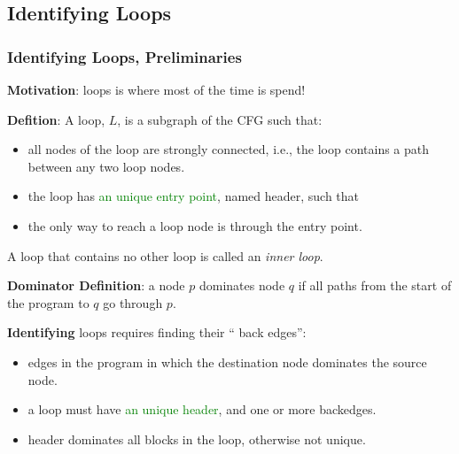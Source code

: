 \documentclass{beamer}
\newcommand{\green}[1]{\textcolor{Green}{{#1}}}
\renewcommand{\emph}[1]{\textcolor{structure}{#1}}
\newcommand{\emp}[1]{\textcolor{DikuRed}{ #1}}
\begin{document}
\subsection{Identifying Loops}


\begin{frame}[fragile,t]
    \frametitle{Identifying Loops, Preliminaries}

{\bf Motivation}: loops is where most of the time is spend!

\pause
\bigskip

{\bf Defition}: A loop, $L$, is a subgraph of the \textsc{CFG} such that:

\begin{itemize}

\item all nodes of the loop are \emp{strongly connected}, i.e., the loop
        contains a path between any two loop nodes.

\item the loop has \green{an unique entry point}, named \emph{header}, such that

\item the only way to reach a loop node is through the entry point.

\end{itemize}

A loop that contains no other loop is called an {\em inner loop}.

\pause
\bigskip

{\bf Dominator Definition}: a node $p$ \emp{dominates} node $q$ if all paths from
the start of the program to $q$ go through $p$.

\bigskip

{\bf Identifying} loops requires finding their ``\emp{back edges}'':

\begin{itemize}

\item edges in the program in which the destination node dominates
        the source node.

\item a loop must have \green{an unique header}, and \emp{one or more backedges}.

\item header dominates all blocks in the loop, otherwise not unique.

\end{itemize}

\end{frame}
\end{document}
